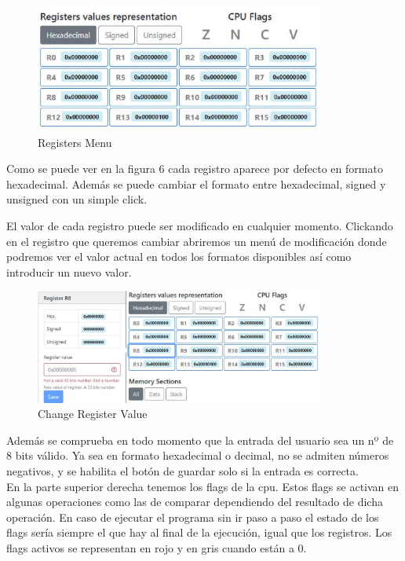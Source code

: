{{            \begin{figure}[h]
                \centering
                \includegraphics[width=0.85\textwidth]{images/registers}
                \caption{Registers Menu}
            \end{figure}

            Como se puede ver en la figura 6 cada registro aparece por defecto en formato hexadecimal.
            Además se puede cambiar el formato entre hexadecimal, signed y unsigned con un simple click.

            El valor de cada registro puede ser modificado en cualquier momento. Clickando en el registro
            que queremos cambiar abriremos un menú de modificación donde podremos ver el valor actual en
            todos los formatos disponibles así como introducir un nuevo valor.

            \begin{figure}[h]
                \centering
                \includegraphics[width=0.85\textwidth]{images/modifyregister}
                \caption{Change Register Value}
            \end{figure}

            Además se comprueba en todo momento que la entrada del usuario sea un nº de 8 bits válido.
            Ya sea en formato hexadecimal o decimal, no se admiten números negativos, y se habilita el botón
            de guardar solo si la entrada es correcta. \\

            En la parte superior derecha tenemos los flags de la cpu. Estos flags se activan en algunas operaciones
            como las de comparar dependiendo del resultado de dicha operación. En caso de ejecutar el programa sin ir
            paso a paso el estado de los flags sería siempre el que hay al final de la ejecución, 
            igual que los registros. Los flags activos se representan en rojo y en gris cuando están a 0.
            \clearpage

}}
